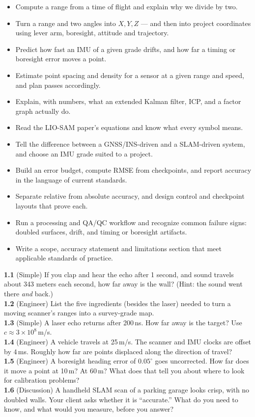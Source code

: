 \begin{itemize}
\item Compute a range from a time of flight and explain why we divide by two.
\item Turn a range and two angles into $X,Y,Z$ --- and then into project coordinates using lever arm, boresight, attitude and trajectory.
\item Predict how fast an IMU of a given grade drifts, and how far a timing or boresight error moves a point.
\item Estimate point spacing and density for a sensor at a given range and speed, and plan passes accordingly.
\item Explain, with numbers, what an extended Kalman filter, ICP, and a factor graph actually do.
\item Read the LIO-SAM paper's equations and know what every symbol means.
\item Tell the difference between a GNSS/INS-driven and a SLAM-driven system, and choose an IMU grade suited to a project.
\item Build an error budget, compute RMSE from checkpoints, and report accuracy in the language of current standards.
\item Separate relative from absolute accuracy, and design control and checkpoint layouts that prove each.
\item Run a processing and QA/QC workflow and recognize common failure signs: doubled surfaces, drift, and timing or boresight artifacts.
\item Write a scope, accuracy statement and limitations section that meet applicable standards of practice.
\end{itemize}

\begin{tryit}[unbreakable]
\textbf{1.1} (Simple) If you clap and hear the echo after 1 second, and sound travels about 343 meters each second, how far away is the wall? (Hint: the sound went there \emph{and} back.)\\
\textbf{1.2} (Engineer) List the five ingredients (besides the laser) needed to turn a moving scanner's ranges into a survey-grade map.\\
\textbf{1.3} (Simple) A laser echo returns after 200\,ns. How far away is the target? Use $c \approx 3 \times 10^8$\,m/s.\\
\textbf{1.4} (Engineer) A vehicle travels at 25\,m/s. The scanner and IMU clocks are offset by 4\,ms. Roughly how far are points displaced along the direction of travel?\\
\textbf{1.5} (Engineer) A boresight heading error of $0.05^\circ$ goes uncorrected. How far does it move a point at 10\,m? At 60\,m? What does that tell you about where to look for calibration problems?\\
\textbf{1.6} (Discussion) A handheld SLAM scan of a parking garage looks crisp, with no doubled walls. Your client asks whether it is ``accurate.'' What do you need to know, and what would you measure, before you answer?
\end{tryit}

